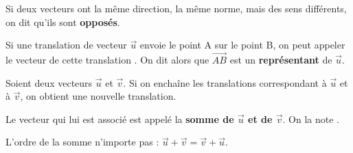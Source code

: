 \documentclass[
	classe=$2^{de}$,
	headerTitle=Généralités\space sur\space les\space vecteurs
]{coursclass}
\begin{document}
\begin{definition}
	Si deux vecteurs ont la même direction, la même norme, mais des sens différents, on dit qu'ils sont \textbf{opposés}.
\end{definition}

\begin{vocabulaire}
	\begin{center}
	\end{center}

	Si une translation de vecteur $\vec{u}$ envoie le point A sur le point B, on peut appeler le vecteur de cette translation . On dit alors que $\vec{AB}$ est un \textbf{représentant} de $\vec{u}$.
\end{vocabulaire}

\begin{definition}
	Soient deux vecteurs $\vec{u}$ et $\vec{v}$. Si on enchaîne les translations correspondant à $\vec{u}$ et à $\vec{v}$, on obtient une nouvelle translation.

	Le vecteur qui lui est associé est appelé la \textbf{somme de $\vec{u}$ et de $\vec{v}$}. On la note .
\end{definition}

\begin{exemple}
	\begin{center}
	\end{center}
\end{exemple}

\begin{remarque}
	L'ordre de la somme n'importe pas : $\vec{u} + \vec{v} = \vec{v} + \vec{u}$.

	\begin{center}
	\end{center}
\end{remarque}
\end{document}
